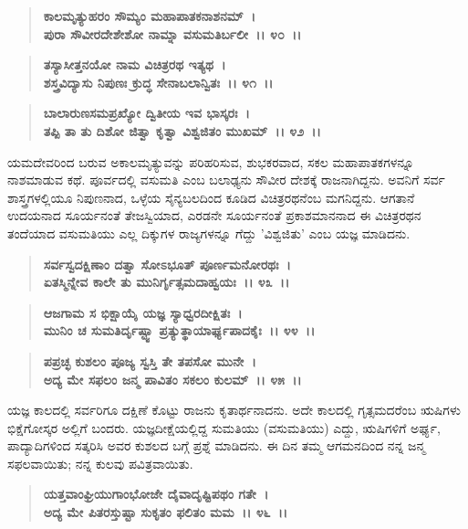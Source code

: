 \begin{verse}
\textbf{ಕಾಲಮೃತ್ಯುಹರಂ ಸೌಮ್ಯಂ ಮಹಾಪಾತಕನಾಶನಮ್~।}\\\textbf{ಪುರಾ ಸೌವೀರದೇಶೇಶೋ ನಾಮ್ನಾ ವಸುಮತಿರ್ಬಲೀ~।। ೪೦~।। }
\end{verse}

\begin{verse}
\textbf{ತಸ್ಯಾಸೀತ್ತನಯೋ ನಾಮ ವಿಚಿತ್ರರಥ ಇತ್ಯಥ~।}\\\textbf{ಶಸ್ತ್ರವಿದ್ಯಾಸು ನಿಪುಣಃ ಕ್ರುದ್ಧ ಸೇನಾಬಲಾನ್ವಿತಃ~।। ೪೧~।।}
\end{verse}

\begin{verse}
\textbf{ಬಾಲಾರುಣಸಮಪ್ರಖ್ಯೋ ದ್ವಿತೀಯ ಇವ ಭಾಸ್ಕರಃ~।}\\\textbf{ತಪ್ಪಿ ತಾ ತು ದಿಶೋ ಜಿತ್ವಾ ಕೃತ್ವಾ ವಿಶ್ವಜಿತಂ ಮುಖಮ್~।। ೪೨~।।}
\end{verse}

ಯಮದೇವರಿಂದ ಬರುವ ಅಕಾಲಮೃತ್ಯುವನ್ನು ಪರಿಹರಿಸುವ, ಶುಭಕರವಾದ, ಸಕಲ ಮಹಾಪಾತಕಗಳನ್ನೂ ನಾಶಮಾಡುವ ಕಥೆ. ಪೂರ್ವದಲ್ಲಿ ವಸುಮತಿ ಎಂಬ ಬಲಾಢ್ಯನು ಸೌವೀರ ದೇಶಕ್ಕೆ ರಾಜನಾಗಿದ್ದನು. ಅವನಿಗೆ ಸರ್ವ ಶಾಸ್ತ್ರಗಳಲ್ಲಿಯೂ ನಿಪುಣನಾದ, ಒಳ್ಳೆಯ ಸೈನ್ಯಬಲದಿಂದ ಕೂಡಿದ ವಿಚಿತ್ರರಥನೆಂಬ ಮಗನಿದ್ದನು. ಆಗತಾನೆ ಉದಯನಾದ ಸೂರ್ಯನಂತೆ ತೇಜಸ್ವಿಯಾದ, ಎರಡನೇ ಸೂರ್ಯನಂತೆ ಪ್ರಕಾಶಮಾನನಾದ ಈ ವಿಚಿತ್ರರಥನ ತಂದೆಯಾದ ವಸುಮತಿಯು ಎಲ್ಲ ದಿಕ್ಕುಗಳ ರಾಜ್ಯಗಳನ್ನೂ ಗೆದ್ದು 'ವಿಶ್ವಜಿತು' ಎಂಬ ಯಜ್ಞ ಮಾಡಿದನು.

\begin{verse}
\textbf{ಸರ್ವಸ್ವದಕ್ಷಿಣಾಂ ದತ್ವಾ ಸೋಽಭೂತ್ ಪೂರ್ಣಮನೋರಥಃ~।}\\\textbf{ಏತಸ್ಮಿನ್ನೇವ ಕಾಲೇ ತು ಮುನಿರ್ಗೃತ್ಸಮದಾಹ್ವಯಃ~।। ೪೩~।। }
\end{verse}

\begin{verse}
\textbf{ಆಜಗಾಮ ಸ ಭಿಕ್ಷಾಯೈ ಯಜ್ಞ ಸ್ಯಾಧ್ವರದೀಕ್ಷಿತಃ~।}\\\textbf{ಮುನಿಂ ಚ ಸುಮತಿರ್ದೃಷ್ಟ್ವಾ ಪ್ರತ್ಯುತ್ಥಾಯಾರ್ಘ್ಯಪಾದಕೈಃ~।। ೪೪~।। }
\end{verse}

\begin{verse}
\textbf{ಪಪ್ರಚ್ಛ ಕುಶಲಂ ಪೂಜ್ಯ ಸ್ವಸ್ತಿ ತೇ ತಪಸೋ ಮುನೇ~।}\\\textbf{ಅದ್ಯ ಮೇ ಸಫಲಂ ಜನ್ಮ ಪಾವಿತಂ ಸಕಲಂ ಕುಲಮ್~।। ೪೫~।।}
\end{verse}

ಯಜ್ಞ ಕಾಲದಲ್ಲಿ ಸರ್ವರಿಗೂ ದಕ್ಷಿಣೆ ಕೊಟ್ಟು ರಾಜನು ಕೃತಾರ್ಥನಾದನು. ಅದೇ ಕಾಲದಲ್ಲಿ ಗೃತ್ಸಮದರೆಂಬ ಋಷಿಗಳು ಭಿಕ್ಷೆಗೋಸ್ಕರ ಅಲ್ಲಿಗೆ ಬಂದರು. ಯಜ್ಞದೀಕ್ಷೆಯಲ್ಲಿದ್ದ ಸುಮತಿಯು (ವಸುಮತಿಯು) ಎದ್ದು, ಋಷಿಗಳಿಗೆ ಅರ್ಘ್ಯ, ಪಾದ್ಯಾದಿಗಳಿಂದ ಸತ್ಕರಿಸಿ ಅವರ ಕುಶಲದ ಬಗ್ಗೆ ಪ್ರಶ್ನೆ ಮಾಡಿದನು. ಈ ದಿನ ತಮ್ಮ ಆಗಮನದಿಂದ ನನ್ನ ಜನ್ಮ ಸಫಲವಾಯಿತು; ನನ್ನ ಕುಲವು ಪವಿತ್ರವಾಯಿತು.

\begin{verse}
\textbf{ಯತ್ತವಾಂಘ್ರಿಯುಗಾಂಭೋಜೇ ದೈವಾದೃಷ್ಟಿಪಥಂ ಗತೇ~।}\\\textbf{ಅದ್ಯ ಮೇ ಪಿತರಸ್ತುಷ್ಟಾ ಸುಕೃತಂ ಫಲಿತಂ ಮಮ~।। ೪೬~।। }
\end{verse}

